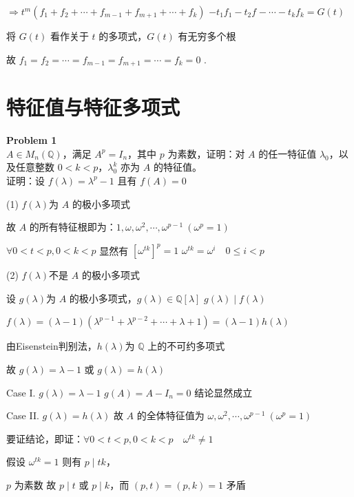 $\Rightarrow t^m(f_1 + f_2+\cdots + f_{m - 1}+f_{m+1}+\cdots + f_k)$ $-t_{1}f_{1}-t_{2}f_{}-\cdots-t_{k}f_{k}=G(t)$

将 \(G(t)\) 看作关于 \(t\) 的多项式，\(G(t)\) 有无穷多个根

故 \(f_1 = f_2=\cdots = f_{m - 1}=f_{m+1}=\cdots = f_k = 0\)  .

\section{特征值与特征多项式}  
\textbf{Problem 1}
\\
\(A\in M_n(\mathbb{Q})\)，满足 \(A^p = I_n\)，其中 \(p\) 为素数，证明：对 \(A\) 的任一特征值 \(\lambda_0\)，以及任意整数 \(0 < k < p\)，\(\lambda_0^k\) 亦为 \(A\) 的特征值。
\\
证明：设 \(f(\lambda)=\lambda^p - 1\)
且有 \(f(A)=0\)

(1) \(f(\lambda)\)为 \(A\) 的极小多项式
\par
故 \(A\) 的所有特征根即为：\(1,\omega,\omega^2,\cdots,\omega^{p - 1}\ (\omega^p = 1)\)
\par
\(\forall 0 < t < p,0 < k < p\)
显然有 \([\omega^{tk}]^p = 1\)
\(\omega^{tk}=\omega^i\quad 0\leq i < p\)

(2) \(f(\lambda)\)不是 \(A\) 的极小多项式
\par
设 \(g(\lambda)\)为 \(A\) 的极小多项式，\(g(\lambda)\in\mathbb{Q}[\lambda]\)
\(g(\lambda)\mid f(\lambda)\)
\par
\(f(\lambda)=(\lambda - 1)(\lambda^{p - 1}+\lambda^{p - 2}+\cdots+\lambda + 1)=(\lambda - 1)h(\lambda)\)
\par
由Eisenstein判别法，\(h(\lambda)\)为 \(\mathbb{Q}\) 上的不可约多项式
\par
故 \(g(\lambda)=\lambda - 1\) 或 \(g(\lambda)=h(\lambda)\)

Case I. \(g(\lambda)=\lambda - 1\)
\(g(A)=A - I_n = 0\)
结论显然成立

Case II. \(g(\lambda)=h(\lambda)\)
故 \(A\) 的全体特征值为 \(\omega,\omega^2,\cdots,\omega^{p - 1}\ (\omega^p = 1)\)
\par
要证结论，即证：\(\forall 0 < t < p,0 < k < p\quad\omega^{tk}\neq1\)
\par
假设 \(\omega^{tk}=1\)
则有 \(p\mid tk\)，
\par
\(p\) 为素数
故 \(p\mid t\) 或 \(p\mid k\)，而 \((p,t)=(p,k)=1\) 矛盾

